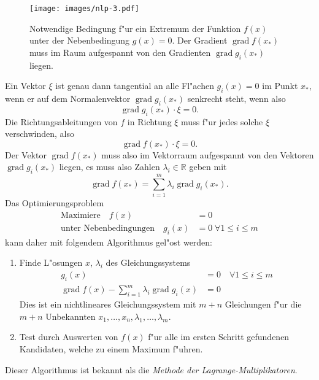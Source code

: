 \begin{figure}
\begin{center}
\texttt{[image: images/nlp-3.pdf]}
\end{center}
\caption{Notwendige Bedingung f"ur ein Extremum der Funktion $f(x)$ unter 
der Nebenbedingung $g(x)=0$. Der Gradient $\operatorname{grad}f(x_*)$
muss im Raum aufgespannt von den Gradienten $\operatorname{grad}g_i(x_*)$
liegen.\label{nlp:lagrange}}
\end{figure}
Ein Vektor $\xi$ ist genau dann tangential an alle Fl"achen $g_i(x)=0$
im Punkt $x_*$,
wenn er auf dem Normalenvektor $\operatorname{grad}g_i(x_*)$
senkrecht steht, wenn also
\begin{equation}
\operatorname{grad}g_i(x_*)\cdot \xi=0.
\end{equation}
Die Richtungsableitungen von $f$ in Richtung $\xi$ muss f"ur jedes solche
$\xi$ verschwinden, also
\begin{equation}
\operatorname{grad}f(x_*)\cdot\xi = 0.
\end{equation}
Der Vektor $\operatorname{grad}f(x_*)$ muss also im Vektorraum
aufgespannt von den Vektoren $\operatorname{grad}g_i(x_*)$ liegen,
es muss also Zahlen $\lambda_i\in\mathbb R$ geben mit
\begin{equation}
\operatorname{grad}f(x_*)=\sum_{i=1}^m\lambda_i \operatorname{grad}g_i(x_*).
\end{equation}
Das Optimierungsproblem 
\begin{align*}
\text{Maximiere}\quad f(x)&=0\\
\text{unter Nebenbedingungen}\quad g_i(x)&=0\;\forall 1\le i\le m
\end{align*}
kann daher mit folgendem Algorithmus gel"ost werden:
\begin{enumerate}
\item Finde L"osungen $x$, $\lambda_i$ des Gleichungssystems
\begin{align*}
g_i(x)&=0\quad\forall 1\le i\le m\\
\operatorname{grad}f(x)-\sum_{i=1}^m\lambda_i\operatorname{grad}g_i(x)&=0
\end{align*}
Dies ist ein nichtlineares Gleichungssystem mit $m+n$ Gleichungen 
f"ur die $m+n$ Unbekannten $x_1,\dots,x_n,\lambda_1,\dots,\lambda_m$.
\item 
Test durch Auswerten von $f(x)$ f"ur alle im ersten Schritt gefundenen
Kandidaten, welche zu einem Maximum f"uhren.
\end{enumerate}
Dieser Algorithmus ist bekannt als die
{\em Methode der Lagrange-Multiplikatoren}.

